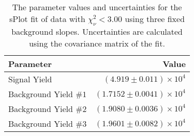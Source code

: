 
\begin{table}[ht]
    \begin{center}
        \begin{tabular}{lr}\toprule
            Parameter & Value \\\midrule
            Signal Yield & $(4.919 \pm 0.011) \times 10^{4}$ \\
            Background Yield $\#1$ & $(1.7152 \pm 0.0041) \times 10^{4}$ \\
            Background Yield $\#2$ & $(1.9080 \pm 0.0036) \times 10^{4}$ \\
            Background Yield $\#3$ & $(1.9601 \pm 0.0082) \times 10^{4}$ \\\bottomrule
        \end{tabular}
        \caption{The parameter values and uncertainties for the sPlot fit of data with $\chi^2_\nu < 3.00$ using three fixed background slopes. Uncertainties are calculated using the covariance matrix of the fit.}\label{tab:splot-fit-results-chisqdof-3.00-fixed-3}
    \end{center}
\end{table}
